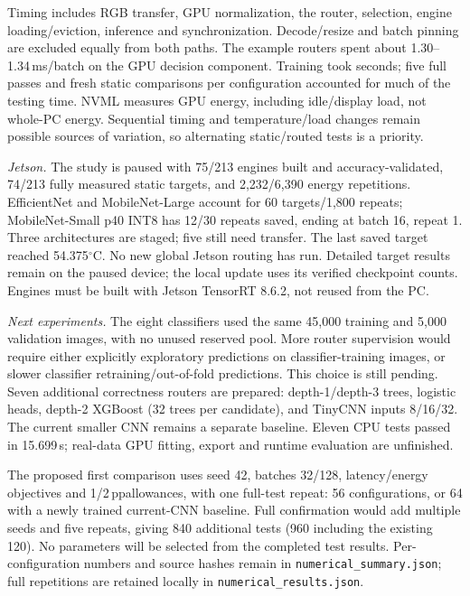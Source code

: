 \documentclass[10pt,a4paper]{article}
\newcommand{\pp}{\,pp}
\newcommand{\code}[1]{\texttt{#1}}
\begin{document}
Timing includes RGB transfer, GPU normalization, the router, selection, engine loading/eviction, inference and synchronization. Decode/resize and batch pinning are excluded equally from both paths. The example routers spent about 1.30--1.34\,ms/batch on the GPU decision component. Training took seconds; five full passes and fresh static comparisons per configuration accounted for much of the testing time. NVML measures GPU energy, including idle/display load, not whole-PC energy. Sequential timing and temperature/load changes remain possible sources of variation, so alternating static/routed tests is a priority.

\textit{Jetson.} The study is paused with 75/213 engines built and accuracy-validated, 74/213 fully measured static targets, and 2,232/6,390 energy repetitions. EfficientNet and MobileNet-Large account for 60 targets/1,800 repeats; MobileNet-Small p40 INT8 has 12/30 repeats saved, ending at batch 16, repeat 1. Three architectures are staged; five still need transfer. The last saved target reached 54.375$^{\circ}$C. No new global Jetson routing has run. Detailed target results remain on the paused device; the local update uses its verified checkpoint counts. Engines must be built with Jetson TensorRT 8.6.2, not reused from the PC.

\textit{Next experiments.} The eight classifiers used the same 45,000 training and 5,000 validation images, with no unused reserved pool. More router supervision would require either explicitly exploratory predictions on classifier-training images, or slower classifier retraining/out-of-fold predictions. This choice is still pending. Seven additional correctness routers are prepared: depth-1/depth-3 trees, logistic heads, depth-2 XGBoost (32 trees per candidate), and TinyCNN inputs 8/16/32. The current smaller CNN remains a separate baseline. Eleven CPU tests passed in 15.699\,s; real-data GPU fitting, export and runtime evaluation are unfinished.

The proposed first comparison uses seed 42, batches 32/128, latency/energy objectives and 1/2\pp allowances, with one full-test repeat: 56 configurations, or 64 with a newly trained current-CNN baseline. Full confirmation would add multiple seeds and five repeats, giving 840 additional tests (960 including the existing 120). No parameters will be selected from the completed test results. Per-configuration numbers and source hashes remain in \code{numerical\_summary.json}; full repetitions are retained locally in \code{numerical\_results.json}.
\end{document}
